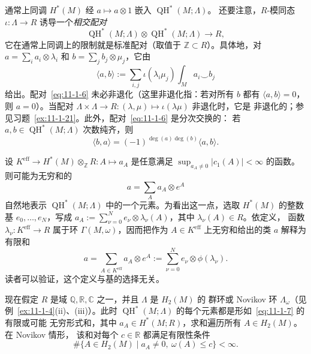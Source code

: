通常上同调 $H^*(M)$ 经 $a\mapsto a\otimes1$ 嵌入 $\operatorname{QH}^*(M;\Lambda)$。
还要注意，$R$-模同态 $\iota:\Lambda\to R$ 诱导一个\emph{相交配对}
\[
  \operatorname{QH}^*(M;\Lambda)\otimes
  \operatorname{QH}^*(M;\Lambda)\longrightarrow R,
\]
它在通常上同调上的限制就是标准配对（取值于 $\mathbb Z\subset R$）。具体地，对
$a=\sum_i a_i\otimes\lambda_i$ 和 $b=\sum_jb_j\otimes\mu_j$，它由
\begin{equation}\label{eq:11-1-6}
  \langle a,b\rangle
  :=\sum_{i,j}\iota(\lambda_i\mu_j)\int_Ma_i\smile b_j
\end{equation}
给出。配对~\eqref{eq:11-1-6} 未必非退化（这里非退化指：若对所有 $b$ 都有
$\langle a,b\rangle=0$，则 $a=0$）。当配对
$\Lambda\times\Lambda\to R:(\lambda,\mu)\mapsto\iota(\lambda\mu)$ 非退化时，它是
非退化的；参见习题~\ref{ex:11-1-21}。此外，配对~\eqref{eq:11-1-6} 是分次交换的：
若 $a,b\in\operatorname{QH}^*(M;\Lambda)$ 次数纯齐，则
\[
  \langle b,a\rangle=(-1)^{\deg(a)\deg(b)}\langle a,b\rangle.
\]

\begin{remark}\label{rem:11-1-7}
设 $K^{\mathrm{eff}}\to H^*(M)\otimes_{\mathbb Z}R:A\mapsto a_A$ 是任意满足
$\sup_{a_A\ne0}|c_1(A)|<\infty$ 的函数。则可能为无穷和的
\begin{equation}\label{eq:11-1-7}
  a=\sum_Aa_A\otimes e^A
\end{equation}
自然地表示 $\operatorname{QH}^*(M;\Lambda)$ 中的一个元素。为看出这一点，选取
$H^*(M)$ 的整数基 $e_0,\ldots,e_N$，写成
$a_A:=\sum_{\nu=0}^Ne_\nu\otimes\lambda_\nu(A)$，其中 $\lambda_\nu(A)\in R$。依定义，
函数 $\lambda_\nu:K^{\mathrm{eff}}\to R$ 属于环 $\Gamma(M,\omega)$，因而把作为
$A\in K^{\mathrm{eff}}$ 上无穷和给出的类 $a$ 解释为有限和
\[
  a=\sum_{A\in K^{\mathrm{eff}}}a_A\otimes e^A
  :=\sum_{\nu=0}^Ne_\nu\otimes\phi(\lambda_\nu).
\]
读者可以验证，这个定义与基的选择无关。

现在假定 $R$ 是域 $\mathbb Q,\mathbb R,\mathbb C$ 之一，并且 $\Lambda$ 是 $H_2(M)$ 的
群环或 Novikov 环 $\Lambda_\omega$（见例~\ref{ex:11-1-4}(ii)、(iii)）。此时
$\operatorname{QH}^*(M;\Lambda)$ 的每个元素都是形如~\eqref{eq:11-1-7} 的有限或可能
无穷形式和，其中 $a_A\in H^*(M;R)$，求和遍历所有 $A\in H_2(M)$。在 Novikov 情形，
该和对每个 $c\in\mathbb R$ 都满足有限性条件
\[
  \#\{A\in H_2(M)\mid a_A\ne0,\ \omega(A)\le c\}<\infty.
\]
\end{remark}

